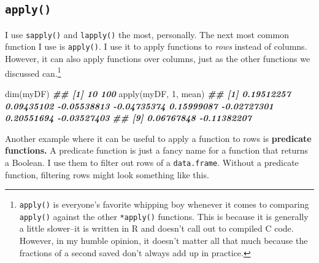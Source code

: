 \documentclass[
  12pt,
]{krantz}
\makeatletter
\newenvironment{Shaded}{\begin{snugshade}}{\end{snugshade}}
\newcommand{\DecValTok}[1]{\textcolor[rgb]{0.06,0.06,0.06}{#1}}
\newcommand{\DocumentationTok}[1]{\textcolor[rgb]{0.37,0.37,0.37}{\textbf{\textit{#1}}}}
\newcommand{\FunctionTok}[1]{\textcolor[rgb]{0,0,0}{#1}}
\newcommand{\NormalTok}[1]{#1}
\newenvironment{kframe}{%
\medskip{}
\setlength{\fboxsep}{.8em}
 \def\at@end@of@kframe{}%
 \ifinner\ifhmode%
  \def\at@end@of@kframe{\end{minipage}}%
  \begin{minipage}{\columnwidth}%
 \fi\fi%
 \def\FrameCommand##1{\hskip\@totalleftmargin \hskip-\fboxsep
 \colorbox{shadecolor}{##1}\hskip-\fboxsep
     \hskip-\linewidth \hskip-\@totalleftmargin \hskip\columnwidth}%
 \MakeFramed {\advance\hsize-\width
   \@totalleftmargin\z@ \linewidth\hsize
   \@setminipage}}%
 {\par\unskip\endMakeFramed%
 \at@end@of@kframe}
\renewenvironment{Shaded}{\begin{kframe}}{\end{kframe}}
\makeatother
\begin{document}
\hypertarget{apply}{%
\subsection{\texorpdfstring{\texttt{apply()}}{apply()}}\label{apply}}

I use \texttt{sapply()} and \texttt{lapply()} the most, personally. The next most common function I use is \texttt{apply()}. I use it to apply functions to \emph{rows} instead of columns. However, it can also apply functions over columns, just as the other functions we discussed can.\footnote{\texttt{apply()} is everyone's favorite whipping boy whenever it comes to comparing \texttt{apply()} against the other \texttt{*apply()} functions. This is because it is generally a little slower--it is written in R and doesn't call out to compiled C code. However, in my humble opinion, it doesn't matter all that much because the fractions of a second saved don't always add up in practice.}

\begin{Shaded}
\begin{Highlighting}[]
\FunctionTok{dim}\NormalTok{(myDF)}
\DocumentationTok{\#\# [1]  10 100}
\FunctionTok{apply}\NormalTok{(myDF, }\DecValTok{1}\NormalTok{, mean)}
\DocumentationTok{\#\#  [1]  0.19512257  0.09435102 {-}0.05538813 {-}0.04735374  0.15999087 {-}0.02727301  0.20551694 {-}0.03527403}
\DocumentationTok{\#\#  [9]  0.06767848 {-}0.11382207}
\end{Highlighting}
\end{Shaded}

Another example where it can be useful to apply a function to rows is \textbf{predicate functions.} A predicate function is just a fancy name for a function that returns a Boolean. I use them to filter out rows of a \texttt{data.frame}. Without a predicate function, filtering rows might look something like this.
\end{document}
